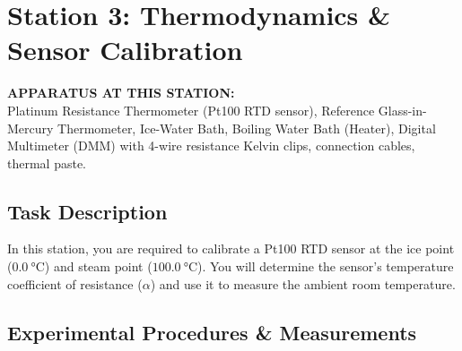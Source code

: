 \section{Station 3: Thermodynamics \& Sensor Calibration}
\label{sec:station3}

\noindent
\begin{tcolorbox}[
    colback=primary!5,
    colframe=primary!30,
    boxrule=0.8pt,
    arc=3pt,
    left=10pt, right=10pt, top=8pt, bottom=8pt
]
\sffamily\small
\textbf{APPARATUS AT THIS STATION:} \\
Platinum Resistance Thermometer (Pt100 RTD sensor), Reference Glass-in-Mercury Thermometer, Ice-Water Bath, Boiling Water Bath (Heater), Digital Multimeter (DMM) with 4-wire resistance Kelvin clips, connection cables, thermal paste.
\end{tcolorbox}

\subsection{Task Description}
In this station, you are required to calibrate a Pt100 RTD sensor at the ice point ($\SI{0.0}{\celsius}$) and steam point ($\SI{100.0}{\celsius}$). You will determine the sensor's temperature coefficient of resistance ($\alpha$) and use it to measure the ambient room temperature.

\subsection{Experimental Procedures \& Measurements}

